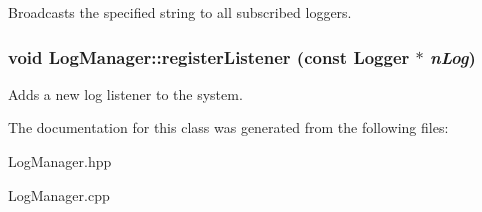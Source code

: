 Broadcasts the specified string to all subscribed loggers.
\subsubsection{\setlength{\rightskip}{0pt plus 5cm}void Log\-Manager::register\-Listener (const {\bf Logger} $\ast$ {\em n\-Log})}\label{classLogManager_a1}


Adds a new log listener to the system.

The documentation for this class was generated from the following files:\begin{CompactItemize}
\item 
Log\-Manager.hpp\item 
Log\-Manager.cpp\end{CompactItemize}
